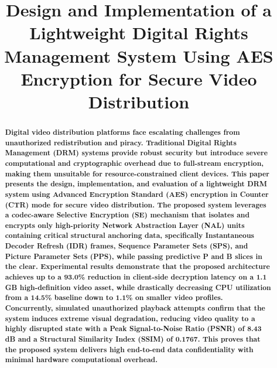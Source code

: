 \documentclass[conference]{IEEEtran}
\begin{document}

\title{Design and Implementation of a Lightweight Digital Rights Management System Using AES Encryption for Secure Video Distribution}

\author{
}

\maketitle
\thispagestyle{fancy}
\vspace{0.5em}

\begin{abstract}
\textbf{Digital video distribution platforms face escalating challenges from unauthorized redistribution and piracy. Traditional Digital Rights Management (DRM) systems provide robust security but introduce severe computational and cryptographic overhead due to full-stream encryption, making them unsuitable for resource-constrained client devices. This paper presents the design, implementation, and evaluation of a lightweight DRM system using Advanced Encryption Standard (AES) encryption in Counter (CTR) mode for secure video distribution. The proposed system leverages a codec-aware Selective Encryption (SE) mechanism that isolates and encrypts only high-priority Network Abstraction Layer (NAL) units containing critical structural anchoring data, specifically Instantaneous Decoder Refresh (IDR) frames, Sequence Parameter Sets (SPS), and Picture Parameter Sets (PPS), while passing predictive P and B slices in the clear. Experimental results demonstrate that the proposed architecture achieves up to a 93.0\% reduction in client-side decryption latency on a 1.1 GB high-definition video asset, while drastically decreasing CPU utilization from a 14.5\% baseline down to 1.1\% on smaller video profiles. Concurrently, simulated unauthorized playback attempts confirm that the system induces extreme visual degradation, reducing video quality to a highly disrupted state with a Peak Signal-to-Noise Ratio (PSNR) of 8.43 dB and a Structural Similarity Index (SSIM) of 0.1767. This proves that the proposed system delivers high end-to-end data confidentiality with minimal hardware computational overhead.}
\end{abstract}
\end{document}

